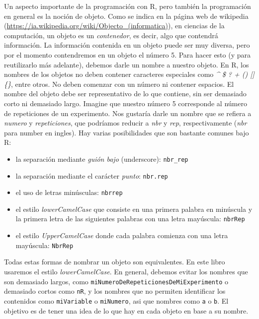 \documentclass[]{book}
\providecommand{\tightlist}{%
  \setlength{\itemsep}{0pt}\setlength{\parskip}{0pt}}
\begin{document}
Un aspecto importante de la programación con R, pero también la
programación en general es la noción de objeto. Como se indica en la
página web de wikipedia
(\url{https://ia.wikipedia.org/wiki/Objecto_(informatica)}), en ciencias
de la computación, un objeto es un \emph{contenedor}, es decir, algo que
contendrá información. La información contenida en un objeto puede ser
muy diversa, pero por el momento contendremos en un objeto el número 5.
Para hacer esto (y para reutilizarlo más adelante), debemos darle un
nombre a nuestro objeto. En R, los nombres de los objetos no deben
contener caracteres especiales como \emph{\^{} \$ ? \textbar{} + ()
{[}{]} \{\}}, entre otros. No deben comenzar con un número ni contener
espacios. El nombre del objeto debe ser representativo de lo que
contiene, sin ser demasiado corto ni demasiado largo. Imagine que
nuestro número 5 corresponde al número de repeticiones de un
experimento. Nos gustaría darle un nombre que se refiera a \emph{numero}
y \emph{repeticiones}, que podríamos reducir a \emph{nbr} y \emph{rep},
respectivamente (\emph{nbr} para number en ingles). Hay varias
posibilidades que son bastante comunes bajo R:

\begin{itemize}
\tightlist
\item
  la separación mediante \emph{guión bajo} (underscore):
  \texttt{nbr\_rep}
\item
  la separación mediante el carácter \emph{punto}: \texttt{nbr.rep}
\item
  el uso de letras minúsculas: \texttt{nbrrep}
\item
  el estilo \emph{lowerCamelCase} que consiste en una primera palabra en
  minúscula y la primera letra de las siguientes palabras con una letra
  mayúscula: \texttt{nbrRep}
\item
  el estilo \emph{UpperCamelCase} donde cada palabra comienza con una
  letra mayúscula: \texttt{NbrRep}
\end{itemize}

Todas estas formas de nombrar un objeto son equivalentes. En este libro
usaremos el estilo \emph{lowerCamelCase}. En general, debemos evitar los
nombres que son demasiado largos, como
\texttt{miNumeroDeRepeticionesDeMiExperimento} o demasiado cortos como
\texttt{nR}, y los nombres que no permiten identificar los contenidos
como \texttt{miVariable} o \texttt{miNumero}, asi que nombres como
\texttt{a} o \texttt{b}. El objetivo es de tener una idea de lo que hay
en cada objeto en base a su nombre.
\end{document}
